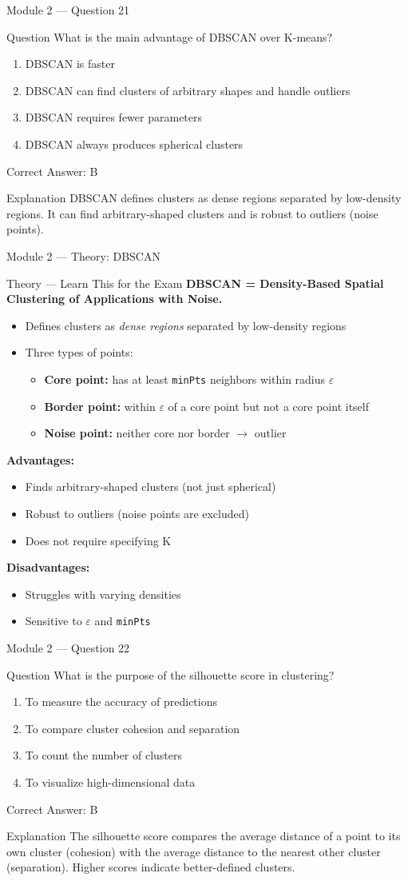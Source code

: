 \documentclass[aspectratio=169,10pt]{beamer}
\newcommand{\question}[1]{%
	\begin{block}{Question}
		#1
	\end{block}
}
\newcommand{\options}[4]{%
	\begin{enumerate}[label=\Alph*.,leftmargin=*]
		\item #1
		\item #2
		\item #3
		\item #4
	\end{enumerate}
}
\newcommand{\answerbox}[1]{%
	\begin{exampleblock}{Correct Answer: #1}
	\end{exampleblock}
}
\newcommand{\explain}[1]{%
	\begin{block}{Explanation}
		\small #1
	\end{block}
}
\newcommand{\theory}[1]{%
	\begin{block}{Theory --- Learn This for the Exam}
		\small #1
	\end{block}
}
\begin{document}
	\begin{frame}{Module 2 --- Question 21}
		\question{What is the main advantage of DBSCAN over K-means?}
		\options{DBSCAN is faster}{DBSCAN can find clusters of arbitrary shapes and handle outliers}{DBSCAN requires fewer parameters}{DBSCAN always produces spherical clusters}
		\answerbox{B}
		\explain{DBSCAN defines clusters as dense regions separated by low-density regions. It can find arbitrary-shaped clusters and is robust to outliers (noise points).}
	\end{frame}
	
	\begin{frame}{Module 2 --- Theory: DBSCAN}
		\theory{
			\textbf{DBSCAN = Density-Based Spatial Clustering of Applications with Noise.}
			\begin{itemize}
				\item Defines clusters as \emph{dense regions} separated by low-density regions
				\item Three types of points:
				\begin{itemize}
					\item \textbf{Core point:} has at least \texttt{minPts} neighbors within radius $\varepsilon$
					\item \textbf{Border point:} within $\varepsilon$ of a core point but not a core point itself
					\item \textbf{Noise point:} neither core nor border $\rightarrow$ outlier
				\end{itemize}
			\end{itemize}
			\textbf{Advantages:}
			\begin{itemize}
				\item Finds arbitrary-shaped clusters (not just spherical)
				\item Robust to outliers (noise points are excluded)
				\item Does not require specifying K
			\end{itemize}
			\textbf{Disadvantages:}
			\begin{itemize}
				\item Struggles with varying densities
				\item Sensitive to $\varepsilon$ and \texttt{minPts}
			\end{itemize}
		}
	\end{frame}
	
	\begin{frame}{Module 2 --- Question 22}
		\question{What is the purpose of the silhouette score in clustering?}
		\options{To measure the accuracy of predictions}{To compare cluster cohesion and separation}{To count the number of clusters}{To visualize high-dimensional data}
		\answerbox{B}
		\explain{The silhouette score compares the average distance of a point to its own cluster (cohesion) with the average distance to the nearest other cluster (separation). Higher scores indicate better-defined clusters.}
	\end{frame}
	
\end{document}
